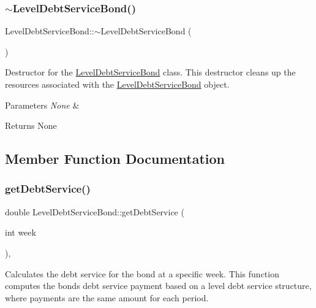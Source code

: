 \subsubsection{\texorpdfstring{$\sim$\+Level\+Debt\+Service\+Bond()}{~LevelDebtServiceBond()}}
{\footnotesize\ttfamily Level\+Debt\+Service\+Bond\+::$\sim$\+Level\+Debt\+Service\+Bond (\begin{DoxyParamCaption}{ }\end{DoxyParamCaption})\hspace{0.3cm}{\ttfamily [override]}}



Destructor for the \mbox{\hyperlink{classLevelDebtServiceBond}{Level\+Debt\+Service\+Bond}} class. This destructor cleans up the resources associated with the \mbox{\hyperlink{classLevelDebtServiceBond}{Level\+Debt\+Service\+Bond}} object. 


\begin{DoxyParams}{Parameters}
{\em None} & \\
\hline
\end{DoxyParams}
\begin{DoxyReturn}{Returns}
None 
\end{DoxyReturn}


\subsection{Member Function Documentation}
\mbox{\label{classLevelDebtServiceBond_adcb3bd3c34b0cbb7b013f387ddd8b7f5}} 
\subsubsection{\texorpdfstring{get\+Debt\+Service()}{getDebtService()}}
{\footnotesize\ttfamily double Level\+Debt\+Service\+Bond\+::get\+Debt\+Service (\begin{DoxyParamCaption}\item[{int}]{week }\end{DoxyParamCaption})\hspace{0.3cm}{\ttfamily [override]}, {\ttfamily [virtual]}}



Calculates the debt service for the bond at a specific week. This function computes the bond\textquotesingle{}s debt service payment based on a level debt service structure, where payments are the same amount for each period. 


